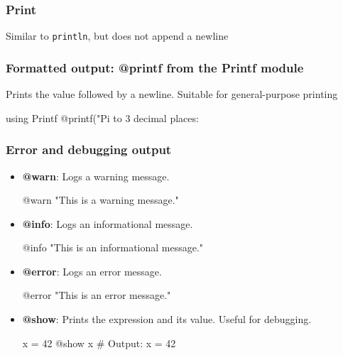 \documentclass{report}
\begin{document}
    \subsubsection{Print}
    \bigbreak \noindent 
    Similar to \texttt{println}, but does not append a newline

    \bigbreak \noindent 
    \subsubsection{Formatted output: @printf from the Printf module}
    \bigbreak \noindent 
    Prints the value followed by a newline. Suitable for general-purpose printing
    \bigbreak \noindent 
    \begin{jlcode}
    using Printf
        @printf("Pi to 3 decimal places: %
    \end{jlcode}
    \bigbreak \noindent 
    \subsubsection{Error and debugging output}
    \bigbreak \noindent 
    \begin{itemize}
        \item \textbf{@warn}: Logs a warning message.
            \bigbreak \noindent 
            \begin{jlcode}
                @warn "This is a warning message."
            \end{jlcode}
        \item \textbf{@info}: Logs an informational message.
            \bigbreak \noindent 
            \begin{jlcode}
            @info "This is an informational message."
            \end{jlcode}
        \item \textbf{@error}: Logs an error message.
            \bigbreak \noindent 
            \begin{jlcode}
            @error "This is an error message."
            \end{jlcode}
        \item \textbf{@show}: Prints the expression and its value. Useful for debugging.
            \bigbreak \noindent 
            \begin{jlcode}
                x = 42
                @show x  # Output: x = 42
            \end{jlcode}
    \end{itemize}
    \bigbreak \noindent 
\end{document}
